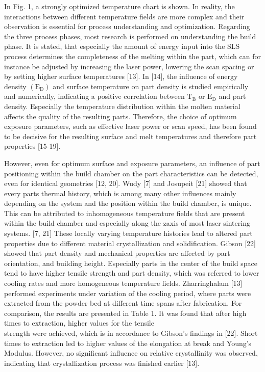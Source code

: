 \documentclass[10pt]{article}
\begin{document}
In Fig. 1, a strongly optimized temperature chart is shown. In reality, the interactions between different temperature fields are more complex and their observation is essential for process understanding and optimization. Regarding the three process phases, most research is performed on understanding the build phase. It is stated, that especially the amount of energy input into the SLS process determines the completeness of the melting within the part, which can for instance be adjusted by increasing the laser power, lowering the scan spacing or by setting higher surface temperatures [13]. In [14], the influence of energy density $\left(\mathrm{E}_{\mathrm{D}}\right)$ and surface temperature on part density is studied empirically and numerically, indicating a positive correlation between $\mathrm{T}_{\mathrm{B}}$ or $\mathrm{E}_{\mathrm{D}}$ and part density. Especially the temperature distribution within the molten material affects the quality of the resulting parts. Therefore, the choice of optimum exposure parameters, such as effective laser power or scan speed, has been found to be decisive for the resulting surface and melt temperatures and therefore part properties [15-19].

However, even for optimum surface and exposure parameters, an influence of part positioning within the build chamber on the part characteristics can be detected, even for identical geometries [12, 20]. Wudy [7] and Josupeit [21] showed that every parts thermal history, which is among many other influences mainly depending on the system and the position within the build chamber, is unique. This can be attributed to inhomogeneous temperature fields that are present within the build chamber and especially along the zaxis of most laser sintering systems. [7, 21] These locally varying temperature histories lead to altered part properties due to different material crystallization and solidification. Gibson [22] showed that part density and mechanical properties are affected by part orientation, and building height. Especially parts in the center of the build space tend to have higher tensile strength and part density, which was referred to lower cooling rates and more homogeneous temperature fields. Zharringhalam [13] performed experiments under variation of the cooling period, where parts were extracted from the powder bed at different time spans after fabrication. For comparison, the results are presented in Table 1. It was found that after high times to extraction, higher values for the tensile\\
strength were achieved, which is in accordance to Gibson's findings in [22]. Short times to extraction led to higher values of the elongation at break and Young's Modulus. However, no significant influence on relative crystallinity was observed, indicating that crystallization process was finished earlier [13].
\end{document}
